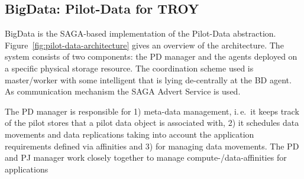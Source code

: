 \documentclass[conference,final]{IEEEtran}
\newcommand{\jhanote}[1]{ {\textcolor{red} { ***shantenu: #1 }}}
\newcommand{\alnote}[1]{ {\textcolor{blue} { ***andre: #1 }}}
\newcommand{\msnote}[1]{ {\textcolor{cyan} { ***mark: #1 }}}
\newcommand{\alnote}[1]{}
\newcommand{\jhanote}[1]{}
\newcommand{\msnote}[1]{}
\newcommand{\upp}{\vspace*{-0.5em}}
\begin{document}
% 
% 
% 


\subsection{BigData: Pilot-Data for TROY}
\label{sec:bigdata}

BigData is the SAGA-based implementation of the Pilot-Data abstraction.
Figure~\ref{fig:pilot-data-architecture} gives an overview of the
architecture. The system consists of two components: the PD manager and
the agents deployed on a specific physical storage resource. The coordination 
scheme used is master/worker with some intelligent that is lying de-centrally at 
the BD agent. As communication mechanism the SAGA Advert Service is used.


The PD manager is responsible for 1) meta-data management, i.\,e.\ it keeps
track of the pilot stores that a pilot data object is associated with, 2) it
schedules data movements and data replications taking into account the
application requirements defined via affinities and 3) for managing data
movements. The PD and PJ manager work closely together to manage compute-/data-affinities for applications


\end{document}
